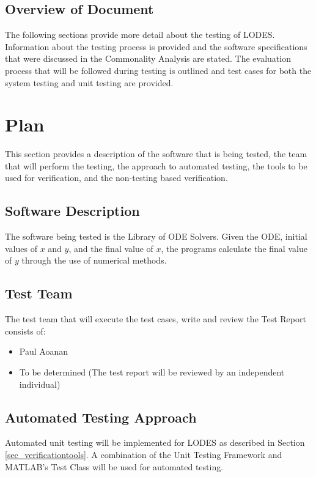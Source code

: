 \documentclass[12pt, titlepage]{article}
\newcommand{\famname}{LODES} %
\newcommand{\famdesc}{Library of ODE Solvers}
\begin{document}
\subsection{Overview of Document}
The following sections provide more detail about the testing of \famname{}.
Information about the testing process is provided and the software specifications
that were discussed in the Commonality Analysis are stated.
The evaluation process that will be followed during testing is outlined and test cases
for both the system testing and unit testing are provided.

\section{Plan}
This section provides a description of the software that is being tested, the team that will
perform the testing, the approach to automated testing, the tools to be used for verification,
and the non-testing based verification. 
	
\subsection{Software Description}
The software being tested is the \famdesc{}. Given the ODE, initial values of $x$ and $y$, and the final value of 
$x$,
the programs calculate the final value of $y$ through the use of numerical methods.

\subsection{Test Team}

The test team that will execute the test cases, write and review the Test Report consists of:
\begin{itemize}
 \item Paul Aoanan
 \item To be determined (The test report will be reviewed by an independent individual)
\end{itemize} 

\subsection{Automated Testing Approach}
Automated unit testing will be implemented for \famname{} as described in Section \ref{sec_verificationtools}.
A combination of the Unit Testing Framework and MATLAB's Test Class will be used for automated testing.

\end{document}
